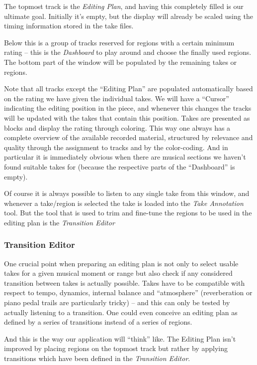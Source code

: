 \documentclass[11pt,a4paper]{article}
\begin{document}
The topmost track is the \emph{Editing Plan}, and having this completely filled is our ultimate goal.
Initially it's empty, but the display will already be scaled using the timing information stored in the take files.

Below this is a group of tracks reserved for regions with a certain minimum rating -- this is the \emph{Dashboard} to play around and choose the finally used regions.
The bottom part of the window will be populated by the remaining takes or regions.

Note that all tracks except the “Editing Plan” are populated automatically based on the rating we have given the individual takes.
We will have a “Cursor” indicating the editing position in the piece, and whenever this changes the tracks will be updated with the takes that contain this position.
Takes are presented as blocks and display the rating through coloring.
This way one always has a complete overview of the available recorded material, structured by relevance and quality through the assignment to tracks and by the color-coding.
And in particular it is immediately obvious when there are musical sections we haven't found suitable takes for (because the respective parts of the “Dashboard” is empty).

Of course it is always possible to listen to any single take from this window, and whenever a take/region is selected the take is loaded into the \emph{Take Annotation} tool.
But the tool that is used to trim and fine-tune the regions to be used in the editing plan is the \emph{Transition Editor}

\subsubsection{Transition Editor}

One crucial point when preparing an editing plan is not only to select usable takes for a given musical moment or range but also check if any considered transition between takes is actually possible.
Takes have to be compatible with respect to tempo, dynamics, internal balance and “atmosphere” (reverberation or piano pedal trails are particularly tricky) -- and this can only be tested by actually listening to a transition.
One could even conceive an editing plan as defined by a series of transitions instead of a series of regions.

And this is the way our application will “think” like.
The Editing Plan isn't improved by placing regions on the topmost track but rather by applying transitions which have been defined in the \emph{Transition Editor}.
\end{document}
